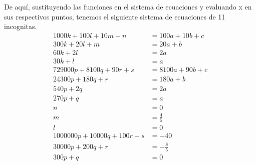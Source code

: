 \documentclass[11pt,letterpaper]{article}
\begin{document}
De aquí, sustituyendo las funciones en el sistema de ecuaciones y evaluando x en sus respectivos puntos, tenemos el siguiente sistema de ecuaciones de 11 incognitas.
\begin{equation}
\begin{split}
  1000k + 100l + 10m + n &= 100a + 10b + c \\
  300k + 20l + m &= 20a + b \\
  60k + 2l &= 2a \\
  30k + l &= a \\
  729000p + 8100q + 90r + s &= 8100a + 90b + c \\
  24300p + 180q + r &= 180a + b \\
  540p + 2q &= 2a \\
  270p + q &= a \\
  n &= 0 \\
  m &= \frac{4}{5} \\
  l &= 0 \\
  1000000p + 10000q + 100r + s &= -40 \\
  30000p + 200q + r &= -\frac{8}{5} \\
  300p + q &= 0
\end{split}
\end{equation}
\end{document}
